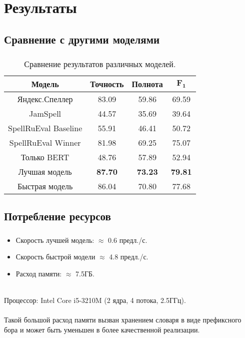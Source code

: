 \documentclass[t, aspectratio=169]{beamer}  %
\begin{document}
\section{Результаты}
\subsection{Сравнение с другими моделями}
\begin{frame}
	\frametitle{\insertsection} 
	\framesubtitle{\insertsubsection}
		\begin{table}
		\begin{center}
			\small
			\begin{tabular}{|c|c|c|c|}
				\hline
				\textbf{Модель} & \textbf{Точность}  & \textbf{Полнота} & $\boldsymbol{F_1}$  \\
				\hline
				Яндекс.Спеллер & 83.09  & 59.86 & 69.59  \\
				JamSpell & 44.57 & 35.69 & 39.64 \\
				SpellRuEval Baseline & 55.91 & 46.41 & 50.72  \\
				SpellRuEval Winner & 81.98 & 69.25 & 75.07  \\
				Только BERT & 48.76 & 57.89 &  52.94 \\
				Лучшая модель & \textbf{87.70} & \textbf{73.23} & \textbf{79.81} \\
				Быстрая модель & 86.04 & 70.80 & 77.68 \\
				\hline
			\end{tabular}
		\end{center}
		\caption{Сравнение результатов различных моделей.}
	\end{table}
\end{frame}

\subsection{Потребление ресурсов}
\begin{frame}
	\frametitle{\insertsection} 
	\framesubtitle{\insertsubsection}
	\begin{itemize}
		\item Скорость лучшей модель: $\approx$ 0.6 предл./с. 
		\item Скорость быстрой модели $\approx$ 4.8 предл./с.
		\item Расход памяти: $\approx$ 7.5ГБ. \\~\\
	\end{itemize}

	Процессор: Intel Core i5-3210M (2 ядра, 4 потока, 2.5ГГц). \\~\\
	
	Такой большой расход памяти вызван хранением словаря в виде префиксного бора и может быть уменьшен в более качественной реализации.
\end{frame}
\end{document}
